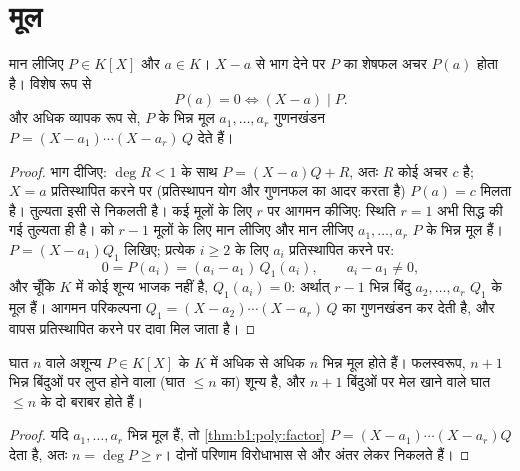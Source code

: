 \section{मूल}

\begin{theorem}[गुणनखंड प्रमेय]\label{thm:b1:poly:factor}
मान लीजिए $P \in K[X]$ और $a \in K$। $X - a$ से भाग देने पर $P$ का शेषफल अचर
$P(a)$ होता है। विशेष रूप से
\[
P(a) = 0 \iff (X - a) \mid P .
\]
और अधिक व्यापक रूप से, $P$ के भिन्न मूल $a_1, \dots, a_r$ गुणनखंडन $P = (X -
a_1)\cdots(X - a_r)\, Q$ देते हैं।
\end{theorem}

\begin{proof}
भाग दीजिए: $\deg R < 1$ के साथ $P = (X - a) Q + R$, अतः $R$ कोई अचर $c$ है;
$X = a$ प्रतिस्थापित करने पर (प्रतिस्थापन योग और गुणनफल का आदर करता है)
$P(a) = c$ मिलता है। तुल्यता इसी से निकलती है। कई मूलों के लिए $r$ पर आगमन
कीजिए: स्थिति $r = 1$ अभी सिद्ध की गई तुल्यता ही है।  को $r - 1$ मूलों के
लिए मान लीजिए और मान लीजिए $a_1, \dots, a_r$ $P$ के भिन्न मूल हैं। $P = (X -
a_1)Q_1$ लिखिए; प्रत्येक $i \geq 2$ के लिए $a_i$ प्रतिस्थापित करने पर:
\[
0 = P(a_i) = (a_i - a_1)\,Q_1(a_i),
\qquad a_i - a_1 \neq 0 ,
\]
और चूँकि $K$ में कोई शून्य भाजक नहीं है, $Q_1(a_i) = 0$: अर्थात् $r - 1$
भिन्न बिंदु $a_2, \dots, a_r$ $Q_1$ के मूल हैं। आगमन परिकल्पना $Q_1 = (X -
a_2)\cdots(X - a_r)\,Q$ का गुणनखंडन कर देती है, और वापस प्रतिस्थापित करने पर
दावा मिल जाता है।
\end{proof}

\begin{corollary}[घात $n$ के बहुपद के अधिक से अधिक $n$ मूल होते हैं]\label{cor:b1:poly:nroots}
घात $n$ वाले अशून्य $P \in K[X]$ के $K$ में अधिक से अधिक $n$ भिन्न मूल होते
हैं। फलस्वरूप, $n + 1$ भिन्न बिंदुओं पर लुप्त होने वाला (घात $\leq n$ का)
 शून्य  है, और $n+1$ बिंदुओं पर मेल खाने वाले घात $\leq n$ के दो
 बराबर होते हैं।
\end{corollary}

\begin{proof}
यदि $a_1, \dots, a_r$ भिन्न मूल हैं, तो \cref{thm:b1:poly:factor} $P =
(X-a_1)\cdots(X-a_r) Q$ देता है, अतः $n = \deg P \geq r$। दोनों परिणाम
विरोधाभास से और अंतर लेकर निकलते हैं।
\end{proof}

